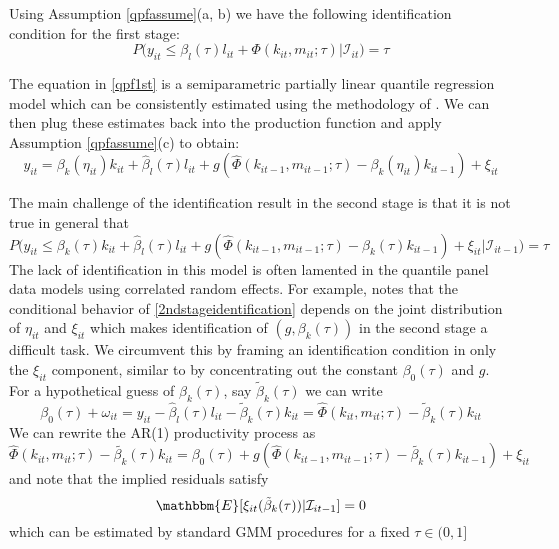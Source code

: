 \documentclass[11pt]{article}
\begin{document}
Using Assumption \eqref{qpfassume}(a, b) we have the following identification condition for the first stage:
\begin{equation} \label{1ststageident}
	P\big(y_{it}\leq \beta_{l}(\tau)l_{it}+\Phi(k_{it}, m_{it}; \tau)\big|\mathcal{I}_{it})=\tau
\end{equation}

The equation in \eqref{qpf1st} is a semiparametric partially linear quantile regression model which can be consistently estimated using the methodology of \cite{Lee2003}. We can then plug these estimates back into the production function and apply Assumption \eqref{qpfassume}(c) to obtain:
\begin{equation} \label{qpf2nd}
y_{it}=\beta_{k}(\eta_{it})k_{it}+\hat{\beta}_{l}(\tau)l_{it}+g(\hat{\Phi}(k_{it-1}, m_{it-1}; \tau)-\beta_{k}(\eta_{it})k_{it-1})+\xi_{it}
\end{equation}

The main challenge of the identification result in the second stage is that it is not true in general that
\begin{equation} \label{2ndstageidentification}
P\big(y_{it}\leq \beta_{k}(\tau)k_{it}+\hat{\beta}_{l}(\tau)l_{it}+g(\hat{\Phi}(k_{it-1}, m_{it-1}; \tau)-\beta_{k}(\tau)k_{it-1})+\xi_{it}|\mathcal{I}_{it-1}\big)=\tau
\end{equation}
The lack of identification in this model is often lamented in the quantile panel data models using correlated random effects. For example, \cite{Canay2011} notes that the conditional behavior of \eqref{2ndstageidentification} depends on the joint distribution of $\eta_{it}$ and $\xi_{it}$ which makes identification of $(g, \beta_{k}(\tau))$ in the second stage a difficult task. We circumvent this by framing an identification condition in only the $\xi_{it}$ component, similar to \cite{Ackerberg2015} by concentrating out the constant $\beta_{0}(\tau)$ and $g$. For a hypothetical guess of $\beta_{k}(\tau)$, say  $\tilde{\beta}_{k}(\tau)$ we can write
\begin{equation}
\beta_{0}(\tau)+\omega_{it}=y_{it}-\hat{\beta}_{l}(\tau)l_{it}-\tilde{\beta}_{k}(\tau)k_{it}=\hat{\Phi}(k_{it}, m_{it}; \tau)-\tilde{\beta}_{k}(\tau)k_{it}
\end{equation}
We can rewrite the AR(1) productivity process as
\begin{equation}
\hat{\Phi}(k_{it}, m_{it}; \tau)-\tilde{\beta_{k}}(\tau)k_{it}=\beta_{0}(\tau)+g(\hat{\Phi}(k_{it-1}, m_{it-1}; \tau)-\tilde{\beta_{k}}(\tau)k_{it-1})+\xi_{it}
\end{equation}
and note that the implied residuals satisfy
\begin{equation}
\mathbbm{E}[\xi_{it}(\tilde{\beta}_{k}(\tau))|\mathcal{I}_{it-1}]=0
\end{equation}
which can be estimated by standard GMM procedures for a fixed $\tau\in (0,1]$\\
\end{document}

